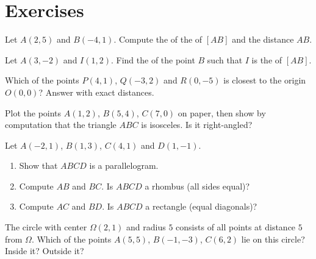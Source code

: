 \section{Exercises}

\begin{exercise}[$\star$]\label{exo:g10:coordgeom:1}
Let $A(2, 5)$ and $B(-4, 1)$. Compute the  of the  of
$[AB]$ and the distance $AB$.
\end{exercise}

\begin{exercise}[$\star$]\label{exo:g10:coordgeom:2}
Let $A(3, -2)$ and $I(1, 2)$. Find the  of the point $B$ such
that $I$ is the  of $[AB]$.
\end{exercise}

\begin{exercise}[$\star$]\label{exo:g10:coordgeom:3}
Which of the points $P(4, 1)$, $Q(-3, 2)$ and $R(0, -5)$ is closest to the
origin $O(0,0)$? Answer with exact distances.
\end{exercise}

\begin{exercise}[$\star$]\label{exo:g10:coordgeom:4}
Plot the points $A(1, 2)$, $B(5, 4)$, $C(7, 0)$ on  paper, then show
by computation that the triangle $ABC$ is isosceles. Is it right-angled?
\end{exercise}

\begin{exercise}[$\star\star$]\label{exo:g10:coordgeom:5}
Let $A(-2, 1)$, $B(1, 3)$, $C(4, 1)$ and $D(1, -1)$.
\begin{enumerate}
  \item Show that $ABCD$ is a parallelogram.
  \item Compute $AB$ and $BC$. Is $ABCD$ a rhombus (all sides equal)?
  \item Compute $AC$ and $BD$. Is $ABCD$ a rectangle (equal diagonals)?
\end{enumerate}
\end{exercise}

\begin{exercise}[$\star\star$]\label{exo:g10:coordgeom:6}
The circle with center $\Omega(2, 1)$ and radius $5$ consists of all
points at distance $5$ from $\Omega$. Which of the points $A(5, 5)$,
$B(-1, -3)$, $C(6, 2)$ lie on this circle? Inside it? Outside it?
\end{exercise}

